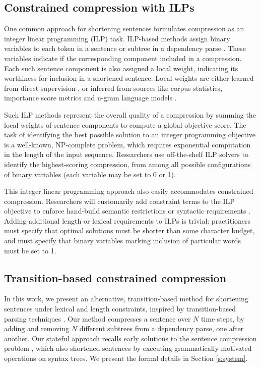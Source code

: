 \documentclass[11pt,a4paper]{article}
\begin{document}
\subsection{Constrained compression with ILPs}\label{s:ilps}

One common approach for shortening sentences formulates compression as an integer linear programming (ILP) task. ILP-based methods assign binary variables to each token in a sentence \cite{clarke2008global} or subtree in a dependency parse \cite{filippova2008dependency}. These variables indicate if the corresponding component included in a compression. Each such sentence component is also assigned a local weight, indicating its worthiness for inclusion in a shortened sentence. Local weights are either learned from direct supervision \cite{filippova2013overcoming,Wang2017CanSH}, or inferred from sources like corpus statistics, importance score metrics and n-gram language models \cite{clarke2008global,filippova2008dependency}.

Such ILP methods represent the overall quality of a compression by summing the local weights of sentence components to compute a global objective score.  The task of identifying the best possible solution to an integer programming objective is a well-known, NP-complete problem, which requires exponential computation in the length of the input sequence. Researchers use off-the-shelf ILP solvers to identify the highest-scoring compression, from among all possible configurations of binary variables (each variable may be set to 0 or 1).

This integer linear programming approach also easily accommodates constrained compression. Researchers will customarily add constraint terms to the ILP objective to enforce hand-build semantic restrictions \cite{clarke2008global} or syntactic requirements \cite{filippova2008dependency}. Adding additional length or lexical requirements to ILPs is trivial: practitioners must specify that optimal solutions must be shorter than some character budget, and must specify that binary variables marking inclusion of particular words must be set to 1. 

\subsection{Transition-based constrained compression}

In this work, we present an alternative, transition-based method for shortening sentences under lexical and length constraints, inspired by transition-based parsing techniques \cite{Earley1970AnEC,nivre2003}. Our method compresses a sentence over $N$ time steps, by adding and removing $N$ different subtrees from a dependency parse, one after another. Our stateful approach recalls early solutions to the sentence compression problem \cite{Jing2000SentenceRF,Knight2000StatisticsBasedS}, which also shortened sentences by executing grammatically-motivated operations on syntax trees. We present the formal details in Section \ref{s:system}. 
\end{document}
